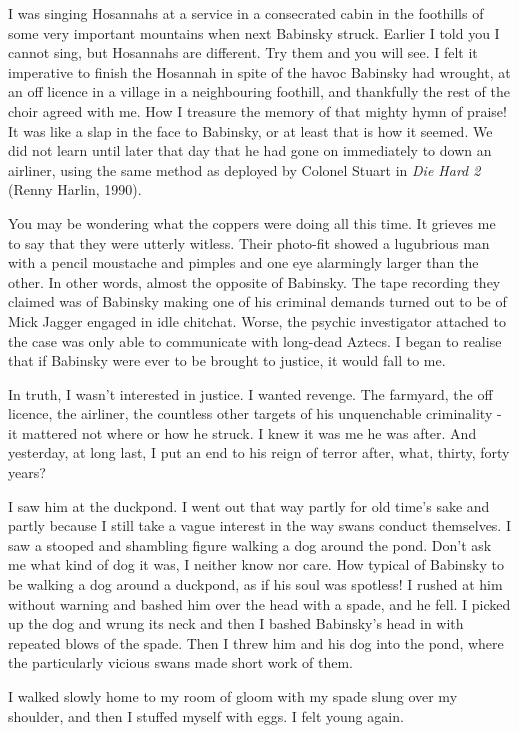 I was singing Hosannahs at a service in a consecrated cabin in the foothills of some very important mountains when next Babinsky struck. Earlier I told you I cannot sing, but Hosannahs are different. Try them and you will see. I felt it imperative to finish the Hosannah in spite of the havoc Babinsky had wrought, at an off licence in a village in a neighbouring foothill, and thankfully the rest of the choir agreed with me. How I treasure the memory of that mighty hymn of praise! It was like a slap in the face to Babinsky, or at least that is how it seemed. We did not learn until later that day that he had gone on immediately to down an airliner, using the same method as deployed by Colonel Stuart in \emph{Die Hard 2} (Renny Harlin, 1990).

You may be wondering what the coppers were doing all this time. It grieves me to say that they were utterly witless. Their photo-fit showed a lugubrious man with a pencil moustache and pimples and one eye alarmingly larger than the other. In other words, almost the opposite of Babinsky. The tape recording they claimed was of Babinsky making one of his criminal demands turned out to be of Mick Jagger engaged in idle chitchat. Worse, the psychic investigator attached to the case was only able to communicate with long-dead Aztecs. I began to realise that if Babinsky were ever to be brought to justice, it would fall to me.

In truth, I wasn't interested in justice. I wanted revenge. The farmyard, the off licence, the airliner, the countless other targets of his unquenchable criminality - it mattered not where or how he struck. I knew it was me he was after. And yesterday, at long last, I put an end to his reign of terror after, what, thirty, forty years?

I saw him at the duckpond. I went out that way partly for old time's sake and partly because I still take a vague interest in the way swans conduct themselves. I saw a stooped and shambling figure walking a dog around the pond. Don't ask me what kind of dog it was, I neither know nor care. How typical of Babinsky to be walking a dog around a duckpond, as if his soul was spotless! I rushed at him without warning and bashed him over the head with a spade, and he fell. I picked up the dog and wrung its neck and then I bashed Babinsky's head in with repeated blows of the spade. Then I threw him and his dog into the pond, where the particularly vicious swans made short work of them.

I walked slowly home to my room of gloom with my spade slung over my shoulder, and then I stuffed myself with eggs. I felt young again.